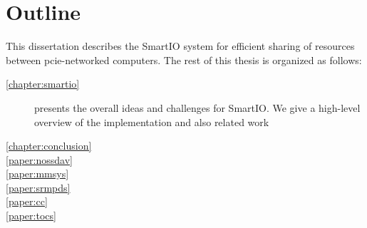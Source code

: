 \section{Outline}
This dissertation describes the SmartIO system for efficient sharing of resources between \gls{pcie}-networked computers.
%
The rest of this thesis is organized as follows:
\begin{description}
    \item[\cref{chapter:smartio}]
        presents the overall ideas and challenges for SmartIO. 
        We give a high-level overview of the implementation and 
        also related work

    \item[\cref{chapter:conclusion}]

    \item[\cref{paper:nossdav}]

    \item[\cref{paper:mmsys}]

    \item[\cref{paper:srmpds}]

    \item[\cref{paper:cc}]

    \item[\cref{paper:tocs}]
\end{description}

